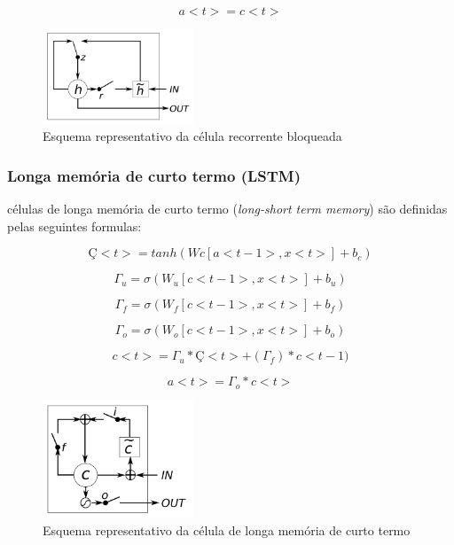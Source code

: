 \documentclass[12pt]{article}
\begin{document}
\begin{equation}
    a<t>=c<t>
\end{equation}


\begin{figure}[!htb]
\centering
\includegraphics[width=0.4\textwidth]{images/gru_gate.png}
\caption{Esquema representativo da célula recorrente bloqueada \cite{DBLP:journals/corr/ChungGCB14}}
\label{fig:gru_gaet}
\end{figure}

\subsubsection{Longa memória de curto termo (LSTM)}

células de longa memória de curto termo (\textit{long-short term memory}) são definidas pelas seguintes formulas:

\begin{equation}
    Ç<t> = tanh(Wc[a<t-1>, x<t>]+b_c)
\end{equation}

\begin{equation}
    \Gamma_u = \sigma(W_u[c<t-1>, x<t>]+b_u)
\end{equation}

\begin{equation}
    \Gamma_f = \sigma(W_f[c<t-1>, x<t>]+b_f)
\end{equation}

\begin{equation}
    \Gamma_o = \sigma(W_o[c<t-1>, x<t>]+b_o)
\end{equation}

\begin{equation}
    c<t>=\Gamma_u*Ç<t>+(\Gamma_f)*c<t-1)
\end{equation}

\begin{equation}
    a<t>=\Gamma_o*c<t>
\end{equation}

\begin{figure}[!htb]
\centering
\includegraphics[width=0.4\textwidth]{images/lstm_gate.png}
\caption{Esquema representativo da célula de longa memória de curto termo \cite{DBLP:journals/corr/ChungGCB14}}
\label{fig:lstm_date}
\end{figure}
\end{document}
